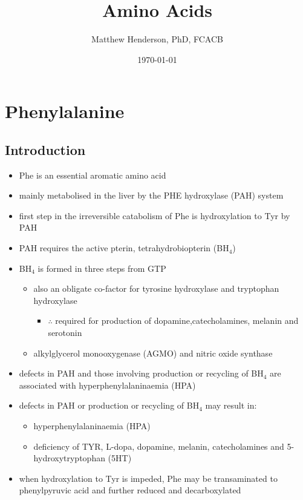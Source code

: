 \documentclass{scrartcl}
\author{Matthew Henderson, PhD, FCACB}
\date{\today}
\title{Amino Acids}
\begin{document}
\maketitle
\setcounter{tocdepth}{2}
\tableofcontents


\section{Phenylalanine}
\label{sec:org2b38b9b}
\subsection{Introduction}
\label{sec:org44dc458}
\begin{itemize}
\item Phe is an essential aromatic amino acid
\item mainly metabolised in the liver by the PHE hydroxylase (PAH) system
\item first step in the irreversible catabolism of Phe is hydroxylation to
Tyr by PAH
\item PAH requires the active pterin, tetrahydrobiopterin (BH\(_{\text{4}}\))
\item BH\(_{\text{4}}\) is formed in three steps from GTP
\begin{itemize}
\item also an obligate co-factor for tyrosine hydroxylase and tryptophan hydroxylase
\begin{itemize}
\item \(\therefore\) required for production of dopamine,catecholamines,
melanin and serotonin
\end{itemize}
\item alkylglycerol monooxygenase (AGMO) and nitric oxide synthase
\end{itemize}

\item defects in PAH and those involving production or recycling of BH\(_{\text{4}}\)
are associated with hyperphenylalaninaemia (HPA)
\item defects in PAH or production or recycling of BH\(_{\text{4}}\) may result in:
\begin{itemize}
\item hyperphenylalaninaemia (HPA)
\item deficiency of TYR, L-dopa, dopamine, melanin, catecholamines and 5-hydroxytryptophan (5HT)
\end{itemize}
\item when hydroxylation to Tyr is impeded, Phe may be transaminated to
phenylpyruvic acid and further reduced and decarboxylated
\end{itemize}
\end{document}
